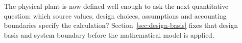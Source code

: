 The physical plant is now defined well enough to ask the next quantitative question: which source values, design choices, assumptions and accounting boundaries specify the calculation? Section~\ref{sec:design-basis} fixes that design basis and system boundary before the mathematical model is applied.